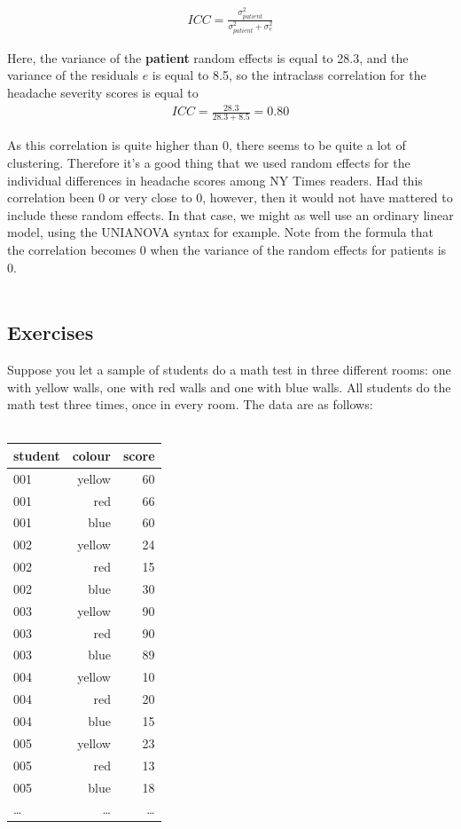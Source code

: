 \documentclass[]{report}\usepackage[]{graphicx}\usepackage[]{color}
\begin{document}
\begin{eqnarray}
ICC = \frac{\sigma^2_{patient} } {\sigma^2_{patient} +\sigma^2_e }   
\end{eqnarray}

Here, the variance of the \textbf{patient} random effects is equal to 28.3, and the variance of the residuals $e$ is equal to 8.5, so the intraclass correlation for the headache severity scores is equal to 
\begin{eqnarray}
ICC = \frac{28.3} {28.3 + 8.5 } =  0.80
\end{eqnarray}

As this correlation is quite higher than 0, there seems to be quite a lot of clustering. Therefore it's a good thing that we used random effects for the individual differences in headache scores among NY Times readers. Had this correlation been 0 or very close to 0, however, then it would not have mattered to include these random effects. In that case, we might as well use an ordinary linear model, using the UNIANOVA syntax for example. Note from the formula that the correlation becomes 0 when the variance of the random effects for patients is 0.
\\
\\


\subsection{Exercises}

Suppose you let a sample of students do a math test in three different rooms: one with yellow walls, one with red walls and one with blue walls. All students do the math test three times, once in every room. The data are as follows:
\\
 \\
 \begin{tabular}{lrr}
 student & colour & score \\ \hline
 001 & yellow & 60 \\
 001 & red & 66 \\
 001 & blue & 60 \\
 002 & yellow & 24 \\
 002 & red & 15 \\
 002 & blue & 30 \\
 003 & yellow & 90 \\
 003 & red & 90 \\
 003 & blue & 89 \\
 004 & yellow & 10 \\
 004 & red & 20 \\
 004 & blue & 15 \\
 005 & yellow & 23 \\
 005 & red & 13 \\
 005 & blue & 18 \\
 \dots & \dots & \dots \\
 \end{tabular}
\\
\\
\end{document}
